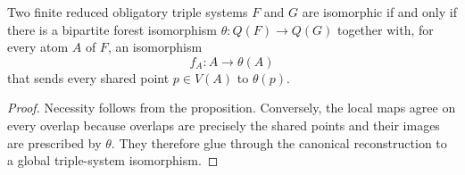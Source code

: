 \begin{corollary}
\label{corollary-decorated-forest-isomorphism}
Two finite reduced obligatory triple systems $F$ and $G$ are isomorphic if and
only if there is a bipartite forest isomorphism $\theta:Q(F)\to Q(G)$ together
with, for every atom $A$ of $F$, an isomorphism
\[
f_A:A\longrightarrow\theta(A)
\]
that sends every shared point $p\in V(A)$ to $\theta(p)$.
\end{corollary}

\begin{proof}
Necessity follows from the proposition.  Conversely, the local maps agree on
every overlap because overlaps are precisely the shared points and their
images are prescribed by $\theta$.  They therefore glue through the canonical
reconstruction to a global triple-system isomorphism.
\end{proof}
